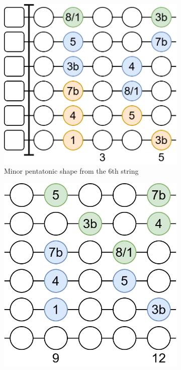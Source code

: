 \begin{figure}[h]
	\vspace{0.5cm}
	
	\begin{subfigure}[b]{0.45\textwidth}
		\centering
		\includegraphics[height=0.175\textheight]{../../Images/guitar_minor_pentatonic_standard.png}
		\caption{Minor pentatonic shape from the 6th string}
		\label{fig:guitar_minor_pentatonic_shape}
	\end{subfigure}
	\hfill
	\begin{subfigure}[b]{0.45\textwidth}
		\centering
		\includegraphics[height=0.175\textheight]{../../Images/guitar_minor_pentatonic_standard_start_5th_string.png}

\end{subfigure}
\end{figure}
